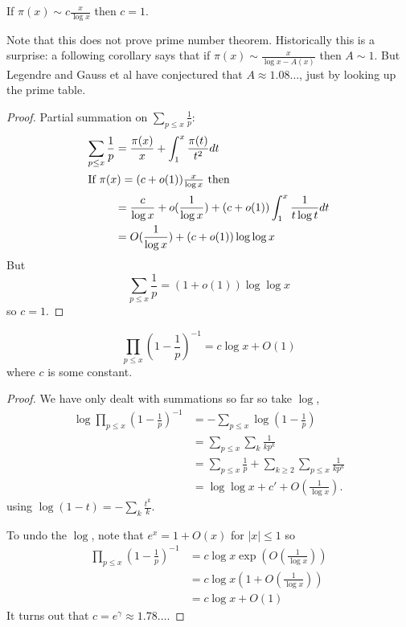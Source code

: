 \documentclass[a4paper]{article}
\theoremstyle{definition}
\begin{document}
\begin{theorem}[Chebyshev]
  If \(\pi(x) \sim c \frac{x}{\log x}\) then \(c = 1\).
\end{theorem}

Note that this does not prove prime number theorem. Historically this is a surprise: a following corollary says that if \(\pi(x) \sim \frac{x}{\log x - A(x)}\) then \(A \sim 1\). But Legendre and Gauss et al have conjectured that \(A \approx 1.08 \dots\), just by looking up the prime table.

\begin{proof}
  Partial summation on \(\sum_{p \leq x} \frac{1}{p}\):
  \begin{align*}
    \sum_{p \leq x} \frac{1}{p}
    &= \frac{\pi(x)}{x} + \int_1^x \frac{\pi(t)}{t^2} dt \\
    \intertext{If \(\pi(x) = (c + o(1)) \frac{x}{\log x}\) then}
    &= \frac{c}{\log x} + o(\frac{1}{\log x}) + (c + o(1)) \int_1^x \frac{1}{t \log t} dt \\
    &= O(\frac{1}{\log x}) + (c + o(1)) \log \log x
  \end{align*}
  But
  \[
    \sum_{p \leq x} \frac{1}{p} = (1 + o(1)) \log \log x
  \]
  so \(c = 1\).
\end{proof}

\begin{lemma}
  \[
    \prod_{p \leq x} \left( 1 - \frac{1}{p} \right)^{-1} = c\log x + O(1)
  \]
  where \(c\) is some constant.
\end{lemma}

\begin{proof}
  We have only dealt with summations so far so take \(\log\),
  \begin{align*}
    \log \prod_{p \leq x} \left( 1 - \frac{1}{p} \right)^{-1}
    &= - \sum_{p \leq x} \log (1 - \frac{1}{p}) \\
    &= \sum_{p \leq x} \sum_k \frac{1}{k p^k} \\
    &= \sum_{p \leq x} \frac{1}{p} + \sum_{k \geq 2} \sum_{p \leq x} \frac{1}{kp^k} \\
    &= \log \log x + c' + O(\frac{1}{\log x}).
  \end{align*}
  using \(\log (1 - t) = - \sum_k \frac{t^k}{k}\).

  To undo the \(\log\), note that \(e^x = 1 + O(x)\) for \(|x| \leq 1\) so
  \begin{align*}
    \prod_{p \leq x} \left( 1 - \frac{1}{p} \right)^{-1}
    &= c \log x \exp (O(\frac{1}{\log x})) \\
    &= c \log x (1 + O(\frac{1}{\log x})) \\
    &= c \log x + O(1)
  \end{align*}
  It turns out that \(c = e^\gamma \approx 1.78 \dots\).
\end{proof}
\end{document}
